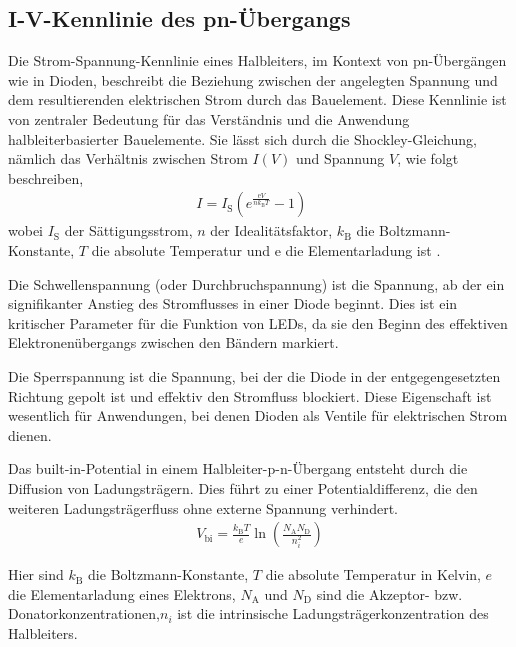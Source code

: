 \subsection{I-V-Kennlinie des pn-Übergangs}
Die Strom-Spannung-Kennlinie eines Halbleiters, im Kontext von pn-Übergängen wie in Dioden, beschreibt die Beziehung zwischen der angelegten Spannung und dem resultierenden elektrischen Strom durch das Bauelement. Diese Kennlinie ist von zentraler Bedeutung für das Verständnis und die Anwendung halbleiterbasierter Bauelemente.
Sie lässt sich durch die Shockley-Gleichung, nämlich das Verhältnis zwischen Strom $I(V)$ und Spannung $V$, wie folgt beschreiben,
\begin{align}
    \label{eq:IV}
    I = I_\mathrm{S} \left( e^{\frac{\mathrm{e}V}{nk_\mathrm{B}T}} - 1 \right) \quad \, 
\end{align}
wobei $I_\mathrm{S}$ der Sättigungsstrom, $n$ der Idealitätsfaktor, $k_\mathrm{B}$ die Boltzmann-Konstante, $T$ die absolute Temperatur und $\mathrm{e}$ die Elementarladung ist \cite{SkriptF13}.


Die Schwellenspannung (oder Durchbruchspannung) ist die Spannung, ab der ein signifikanter Anstieg des Stromflusses in einer Diode beginnt. Dies ist ein kritischer Parameter für die Funktion von LEDs, da sie den Beginn des effektiven Elektronenübergangs zwischen den Bändern markiert.

Die Sperrspannung ist die Spannung, bei der die Diode in der entgegengesetzten Richtung gepolt ist und effektiv den Stromfluss blockiert. Diese Eigenschaft ist wesentlich für Anwendungen, bei denen Dioden als Ventile für elektrischen Strom dienen.



Das built-in-Potential in einem Halbleiter-p-n-Übergang entsteht durch die Diffusion von Ladungsträgern. Dies führt zu einer Potentialdifferenz, die den weiteren Ladungsträgerfluss ohne externe Spannung verhindert.
\begin{align}
 V_\mathrm{bi} = \frac{k_\mathrm{B}T}{e} \ln\left(\frac{N_\mathrm{A} N_\mathrm{D}}{n_i^2}\right)
\end{align}

Hier sind $k_\mathrm{B}$ die Boltzmann-Konstante, $T$ die absolute Temperatur in Kelvin, $e$ die Elementarladung eines Elektrons, $N_\mathrm{A}$ und $N_\mathrm{D}$ sind die Akzeptor- bzw. Donatorkonzentrationen,$n_i$ ist die intrinsische Ladungsträgerkonzentration des Halbleiters.



